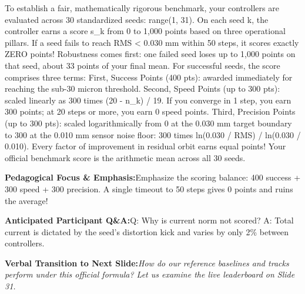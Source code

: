 \documentclass[11pt,a4paper]{article}
\begin{document}
\begin{tcolorbox}[colback=white,colframe=primaryblue,title={\footnotesize\bfseries\color{white}Spoken Presenter Script},fontupper=\small,left=6pt,right=6pt,top=3pt,bottom=3pt,boxrule=0.8pt,arc=2.5pt]
To establish a fair, mathematically rigorous benchmark, your controllers are evaluated across 30 standardized seeds: range(1, 31). On each seed k, the controller earns a score s\_k from 0 to 1,000 points based on three operational pillars. If a seed fails to reach RMS < 0.030 mm within 50 steps, it scores exactly ZERO points! Robustness comes first: one failed seed loses up to 1,000 points on that seed, about 33 points of your final mean. For successful seeds, the score comprises three terms: First, Success Points (400 pts): awarded immediately for reaching the sub-30 micron threshold. Second, Speed Points (up to 300 pts): scaled linearly as 300 times (20 - n\_k) / 19. If you converge in 1 step, you earn 300 points; at 20 steps or more, you earn 0 speed points. Third, Precision Points (up to 300 pts): scaled logarithmically from 0 at the 0.030 mm target boundary to 300 at the 0.010 mm sensor noise floor: 300 times ln(0.030 / RMS) / ln(0.030 / 0.010). Every factor of improvement in residual orbit earns equal points! Your official benchmark score is the arithmetic mean across all 30 seeds.
\end{tcolorbox}
\vspace{0.2em}
\begin{tcolorbox}[colback=lightbg,colframe=bordergray,left=6pt,right=6pt,top=3pt,bottom=3pt,boxrule=0.6pt,arc=2.5pt]
\small
\noindent\textbf{\color{navy}Pedagogical Focus \& Emphasis:}\enspace Emphasize the scoring balance: 400 success + 300 speed + 300 precision. A single timeout to 50 steps gives 0 points and ruins the average!\par\vspace{0.3em}
\noindent\textbf{\color{successgreen}Anticipated Participant Q\&A:}\enspace Q: Why is current norm not scored? A: Total current is dictated by the seed's distortion kick and varies by only 2\% between controllers.\par\vspace{0.3em}
\noindent\textbf{\color{accent}Verbal Transition to Next Slide:}\enspace \emph{How do our reference baselines and tracks perform under this official formula? Let us examine the live leaderboard on Slide 31.}
\end{tcolorbox}
\clearpage
\hypertarget{slide.31}{}
{}
\end{document}
